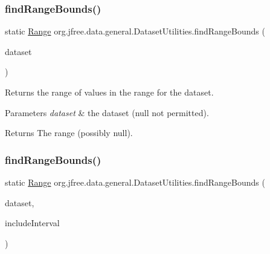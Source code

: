 \subsubsection{\texorpdfstring{find\+Range\+Bounds()}{findRangeBounds()}\hspace{0.1cm}{\footnotesize\ttfamily [1/6]}}
{\footnotesize\ttfamily static \mbox{\hyperlink{classorg_1_1jfree_1_1data_1_1_range}{Range}} org.\+jfree.\+data.\+general.\+Dataset\+Utilities.\+find\+Range\+Bounds (\begin{DoxyParamCaption}\item[{\mbox{\hyperlink{interfaceorg_1_1jfree_1_1data_1_1category_1_1_category_dataset}{Category\+Dataset}}}]{dataset }\end{DoxyParamCaption})\hspace{0.3cm}{\ttfamily [static]}}

Returns the range of values in the range for the dataset.


\begin{DoxyParams}{Parameters}
{\em dataset} & the dataset ({\ttfamily null} not permitted).\\
\hline
\end{DoxyParams}
\begin{DoxyReturn}{Returns}
The range (possibly {\ttfamily null}). 
\end{DoxyReturn}
\mbox{\label{classorg_1_1jfree_1_1data_1_1general_1_1_dataset_utilities_af24d00815f3c6487bd80df8b148acfeb}} 
\subsubsection{\texorpdfstring{find\+Range\+Bounds()}{findRangeBounds()}\hspace{0.1cm}{\footnotesize\ttfamily [2/6]}}
{\footnotesize\ttfamily static \mbox{\hyperlink{classorg_1_1jfree_1_1data_1_1_range}{Range}} org.\+jfree.\+data.\+general.\+Dataset\+Utilities.\+find\+Range\+Bounds (\begin{DoxyParamCaption}\item[{\mbox{\hyperlink{interfaceorg_1_1jfree_1_1data_1_1category_1_1_category_dataset}{Category\+Dataset}}}]{dataset,  }\item[{boolean}]{include\+Interval }\end{DoxyParamCaption})\hspace{0.3cm}{\ttfamily [static]}}

